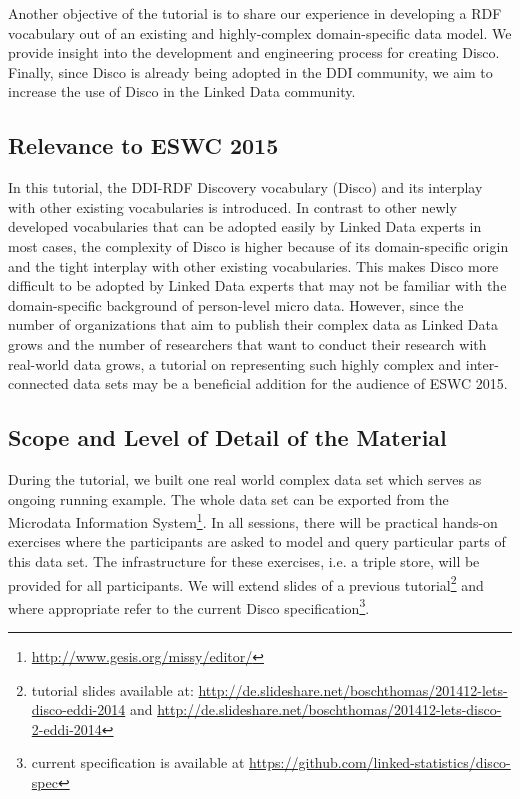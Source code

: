 \documentclass{llncs}
\begin{document}
Another objective of the tutorial is to share our experience in developing a RDF vocabulary out of an existing and highly-complex domain-specific data model. We provide insight into the development and engineering process for creating Disco.
Finally, since Disco is already being adopted in the DDI community, we aim to increase the use of Disco in the Linked Data community.

\subsection{Relevance to ESWC 2015}
In this tutorial, the DDI-RDF Discovery vocabulary (Disco) and its interplay with other existing vocabularies is introduced. In contrast to other newly developed vocabularies that can be adopted easily by Linked Data experts in most cases, the complexity of Disco is higher because of its domain-specific origin and the tight interplay with other existing vocabularies. This makes Disco more difficult to be adopted by Linked Data experts that may not be familiar with the domain-specific background of person-level micro data. However, since the number of organizations that aim to publish their complex data as Linked Data grows and the number of researchers that want to conduct their research with real-world data grows, a tutorial on representing such highly complex and inter-connected data sets may be a beneficial addition for the audience of ESWC 2015.

\subsection{Scope and Level of Detail of the Material}

During the tutorial, we built one real world complex data set which serves as ongoing running example. 
The whole data set can be exported from the Microdata Information System\footnote{\url{http://www.gesis.org/missy/editor/}}. 
In all sessions, there will be practical hands-on exercises where the participants are asked to model and query particular parts of this data set. 
The infrastructure for these exercises, i.e. a triple store, will be provided for all participants.
We will extend slides of a previous tutorial\footnote{tutorial slides available at: \url{http://de.slideshare.net/boschthomas/201412-lets-disco-eddi-2014} and \url{http://de.slideshare.net/boschthomas/201412-lets-disco-2-eddi-2014}} 
and where appropriate refer to the current Disco specification\footnote{current specification is available at \url{https://github.com/linked-statistics/disco-spec}}.
\end{document}
